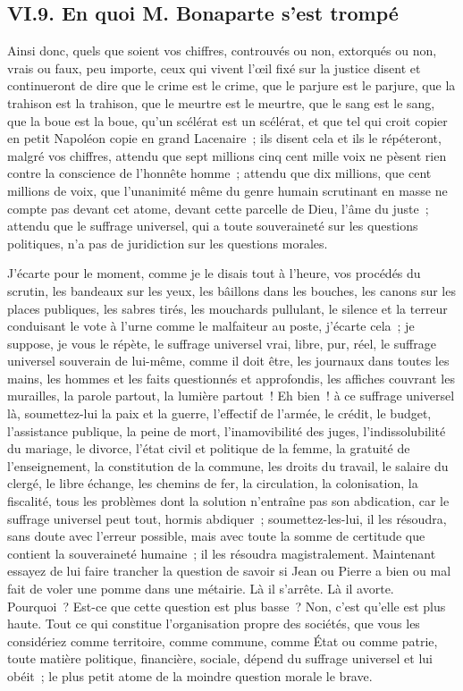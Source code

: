 \documentclass[french,twoside]{book} %
\begin{document}
\subsection[{VI.9. En quoi M. Bonaparte s’est trompé}]{VI.9. En quoi M. Bonaparte s’est trompé}
\noindent Ainsi donc, quels que soient vos chiffres, controuvés ou non, extorqués ou non, vrais ou faux, peu importe, ceux qui vivent l’œil fixé sur la justice disent et continueront de dire que le crime est le crime, que le parjure est le parjure, que la trahison est la trahison, que le meurtre est le meurtre, que le sang est le sang, que la boue est la boue, qu’un scélérat est un scélérat, et que tel qui croit copier en petit Napoléon copie en grand Lacenaire ; ils disent cela et ils le répéteront, malgré vos chiffres, attendu que sept millions cinq cent mille voix ne pèsent rien contre la conscience de l’honnête homme ; attendu que dix millions, que cent millions de voix, que l’unanimité même du genre humain scrutinant en masse ne compte pas devant cet atome, devant cette parcelle de Dieu, l’âme du juste ; attendu que le suffrage universel, qui a toute souveraineté sur les questions politiques, n’a pas de juridiction sur les questions morales.\par
J’écarte pour le moment, comme je le disais tout à l’heure, vos procédés du scrutin, les bandeaux sur les yeux, les bâillons dans les bouches, les canons sur les places publiques, les sabres tirés, les mouchards pullulant, le silence et la terreur conduisant le vote à l’urne comme le malfaiteur au poste, j’écarte cela ; je suppose, je vous le répète, le suffrage universel vrai, libre, pur, réel, le suffrage universel souverain de lui-même, comme il doit être, les journaux dans toutes les mains, les hommes et les faits questionnés et approfondis, les affiches couvrant les murailles, la parole partout, la lumière partout ! Eh bien ! à ce suffrage universel là, soumettez-lui la paix et la guerre, l’effectif de l’armée, le crédit, le budget, l’assistance publique, la peine de mort, l’inamovibilité des juges, l’indissolubilité du mariage, le divorce, l’état civil et politique de la femme, la gratuité de l’enseignement, la constitution de la commune, les droits du travail, le salaire du clergé, le libre échange, les chemins de fer, la circulation, la colonisation, la fiscalité, tous les problèmes dont la solution n’entraîne pas son abdication, car le suffrage universel peut tout, hormis abdiquer ; soumettez-les-lui, il les résoudra, sans doute avec l’erreur possible, mais avec toute la somme de certitude que contient la souveraineté humaine ; il les résoudra magistralement. Maintenant essayez de lui faire trancher la question de savoir si Jean ou Pierre a bien ou mal fait de voler une pomme dans une métairie. Là il s’arrête. Là il avorte. Pourquoi ? Est-ce que cette question est plus basse ? Non, c’est qu’elle est plus haute. Tout ce qui constitue l’organisation propre des sociétés, que vous les considériez comme territoire, comme commune, comme État ou comme patrie, toute matière politique, financière, sociale, dépend du suffrage universel et lui obéit ; le plus petit atome de la moindre question morale le brave.\par
\end{document}
